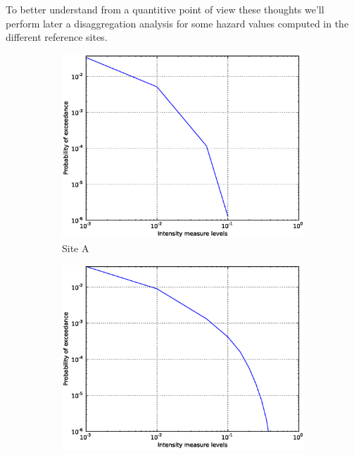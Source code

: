 To better understand from a quantitive point of view these thoughts 
we'll perform later a disaggregation analysis for some hazard values 
computed in the different reference sites.
\begin{figure}[ht]
\centering
    \begin{subfigure}[t]{0.4\textwidth}
        \includegraphics[width=\textwidth]{./figures/peer_set1_test10/000_-122.00_36.87.eps}
        \caption{Site A}
    \end{subfigure}
    \begin{subfigure}[t]{0.4\textwidth}
        \includegraphics[width=\textwidth]{./figures/peer_set1_test10/001_-122.00_37.10.eps}

\end{subfigure}
\end{figure}
